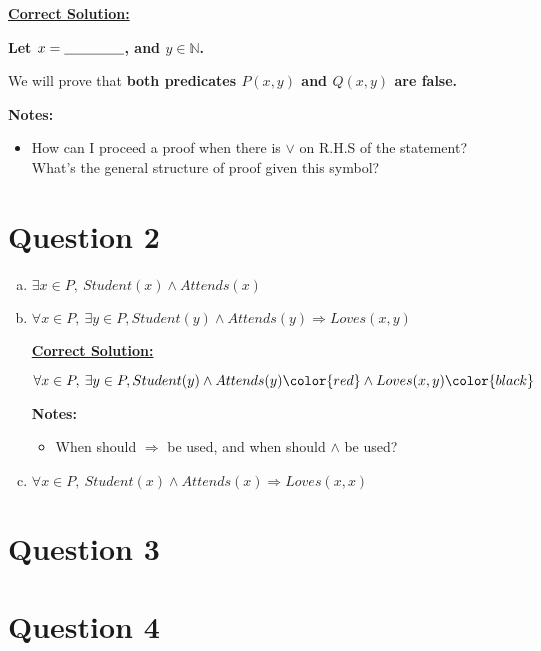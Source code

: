 \documentclass[12pt]{article}
\begin{document}
\begin{enumerate}[a.]
    \begin{mdframed}
        \underline{\textbf{Correct Solution:}}

        \color{red}
        \textbf{Let $x = \underline{\hspace{1.5cm}}$, and $y \in \mathbb{N}$.}

        \bigskip

        We will prove that \color{red}\textbf{both predicates $P(x,y)$ and $Q(x,y)$
        are false.}\color{black}

        \color{black}

    \end{mdframed}


    \textbf{Notes:}
    \begin{itemize}
        \item How can I proceed a proof when there is $\lor$ on R.H.S of the statement?
        What's the general structure of proof given this symbol?
    \end{itemize}
\end{enumerate}

\section*{Question 2}
\begin{enumerate}[a.]
    \item $\exists x \in P,\:Student(x) \land Attends(x)$
    \item

    $\forall x \in P,\:\exists y \in P, Student(y) \land Attends(y) \Rightarrow Loves(x,y)$

    \begin{mdframed}
        \underline{\textbf{Correct Solution:}}

        \bigskip

        $\forall x \in P,\:\exists y \in P, Student(y) \land Attends(y) \color{red}\land Loves(x,y)\color{black}$
    \end{mdframed}

    \textbf{Notes:}
    \begin{itemize}
        \item When should $\Rightarrow$ be used, and when should $\land$ be used?
    \end{itemize}

    \item

    $\forall x \in P,\: Student(x) \land Attends(x) \Rightarrow Loves(x,x)$
\end{enumerate}

\section*{Question 3}

\section*{Question 4}
\end{document}
